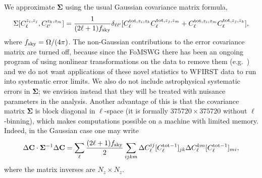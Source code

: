\documentclass[aps,prd, amsmath,amssymb,superscriptaddress,showkeys,nofootinbib,reprint,preprintnumbers]{revtex4-1}
\begin{document}
\begin{widetext}
We approximate ${\boldsymbol\Sigma}$ using the usual Gaussian
covariance matrix formula,
\begin{equation}
\Sigma[C^{z_i,z_j}_\ell, C^{z_k,z_m}_{\ell'}] = \frac{1}{(2\ell+1)f_{\rm sky}} \delta_{\ell\ell'} [ C^{{\rm tot},z_i,z_k}_\ell C^{{\rm tot},z_j,z_m}_\ell + C^{{\rm tot},z_i,z_m}_\ell C^{{\rm tot},z_j,z_k}_\ell],
\label{eq:SGauss}
\end{equation}
where $f_{\rm sky} = \Omega/(4\pi)$.  The non-Gaussian contributions
to the error covariance matrix are turned off, because since the
FoMSWG \cite{2009arXiv0901.0721A} there has been an ongoing program of
using nonlinear transformations on the data to remove them (e.g.\
\cite{2009ApJ...698L..90N, 2011ApJ...729L..11S}) and
we do not want applications of these novel statistics to WFIRST data
to run into systematic error limits. We also do not include astrophysical systematic errors in ${\boldsymbol\Sigma}$; we envision instead that they will be treated with nuisance parameters in the analysis. Another advantage of this is that the covariance matrix ${\boldsymbol\Sigma}$ is block diagonal in $\ell$-space (it is formally $375720\times375720$ without $\ell$-binning), which makes computations possible on a machine with limited memory. Indeed, in the Gaussian case one may write
\begin{equation}
\Delta{\bf C} \cdot {\boldsymbol\Sigma}^{-1} \Delta {\bf C}
= \sum_\ell \frac{(2\ell+1)f_{\rm sky}}2 \sum_{ijkm}
 \Delta C_\ell^{ij} [C^{{\rm tot}-1}_\ell]_{jk}
 \Delta C_\ell^{km} [C^{{\rm tot}-1}_\ell]_{mi},
\label{eq:sprodform}
\end{equation}
where the matrix inverses are $N_z\times N_z$.


\end{widetext}
\end{document}
